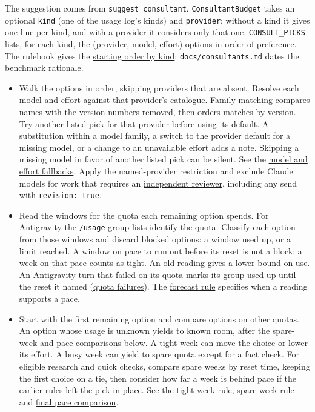 \documentclass[10pt,a4paper]{article}
\newcommand{\code}[1]{\texttt{#1}}
\begin{document}
The suggestion comes from \code{suggest\_consultant}. \code{ConsultantBudget} takes an optional
\code{kind} (one of the usage log's kinds) and \code{provider}; without a kind it gives one line per
kind, and with a provider it considers only that one. \code{CONSULT\_PICKS} lists, for each kind,
the (provider, model, effort) options in order of preference. The rulebook gives the
\href{https://github.com/jibarix/nouez/blob/v0.31.2/docs/rules.md#rule-starting-picks}{starting order by kind};
\code{docs/consultants.md} dates the benchmark rationale.

\begin{itemize}
\item Walk the options in order, skipping providers that are absent. Resolve each model and effort
  against that provider's catalogue. Family matching compares names with the version numbers
  removed, then orders matches by version. Try another listed pick for that provider before
  using its default. A substitution within a model family, a switch to the provider default
  for a missing model, or a change to an unavailable effort adds a note. Skipping a missing
  model in favor of another listed pick can be silent. See the
  \href{https://github.com/jibarix/nouez/blob/v0.31.2/docs/rules.md#rule-catalogue-fallback}{model and effort fallbacks}.
  Apply the named-provider restriction and exclude Claude models for work that requires an
  \href{https://github.com/jibarix/nouez/blob/v0.31.2/docs/rules.md#rule-independent-review}{independent reviewer},
  including any send with \code{revision: true}.
\item Read the windows for the quota each remaining option spends. For Antigravity the
  \code{/usage} group lists identify the quota. Classify each option from those windows and
  discard blocked options: a window used up, or a limit reached. A window on pace to run out
  before its reset is not a block; a week on that pace counts as tight. An old reading gives a lower bound on use. An Antigravity turn that
  failed on its quota marks its group used up until the reset it named
  (\href{https://github.com/jibarix/nouez/blob/v0.31.2/docs/rules.md#rule-quota-hit}{quota failures}). The
  \href{https://github.com/jibarix/nouez/blob/v0.31.2/docs/rules.md#rule-usage-forecast}{forecast rule}
  specifies when a reading supports a pace.
\item Start with the first remaining option and compare options on other quotas. An option whose
  usage is unknown yields to known room, after the spare-week and pace comparisons below. A tight week can move the choice or lower its effort.
  A busy week can yield to spare quota except for a fact check. For eligible research and quick
  checks, compare spare weeks by reset time, keeping the first choice on a tie, then consider
  how far a week is behind pace if the earlier rules left the pick in place. See the
  \href{https://github.com/jibarix/nouez/blob/v0.31.2/docs/rules.md#rule-tight-week}{tight-week rule},
  \href{https://github.com/jibarix/nouez/blob/v0.31.2/docs/rules.md#rule-spare-week}{spare-week rule}
  and \href{https://github.com/jibarix/nouez/blob/v0.31.2/docs/rules.md#rule-behind-pace}{final pace comparison}.
\end{itemize}
\end{document}

